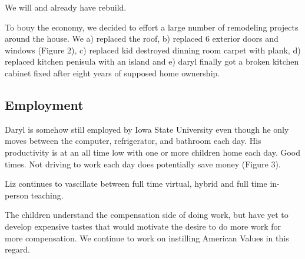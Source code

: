\documentclass[letterpaper,11pt]{article}
\makeatletter
\newenvironment{figurehere}
  {\def\@captype{figure}}
  {}
\makeatother
\begin{document}
\begin{multicols}{2}
\begin{figurehere}
    \centering   
    \caption{We will and already have rebuild.}
\end{figurehere}

To bouy the economy, we decided to effort a large number of remodeling projects
around the house. We a) replaced the roof, b) replaced 6 exterior doors and
windows (Figure 2), c) replaced kid destroyed dinning room carpet with plank, d) replaced 
kitchen penisula with an island and e) daryl finally got a broken kitchen cabinet
fixed after eight years of supposed home ownership.

\subsection{Employment}

Daryl is somehow still employed by Iowa State University even though he only
moves between the computer, refrigerator, and bathroom each day.  His productivity
is at an all time low with one or more children home each day.  Good times. Not
driving to work each day does potentially save money (Figure 3).

Liz continues to vascillate between full time virtual, hybrid and full time
in-person teaching.

The children understand the compensation side of doing work, but have yet to
develop expensive tastes that would motivate the desire to do more work
for more compensation.  We continue to work on instilling American Values in
this regard.


\end{multicols}
\end{document}
